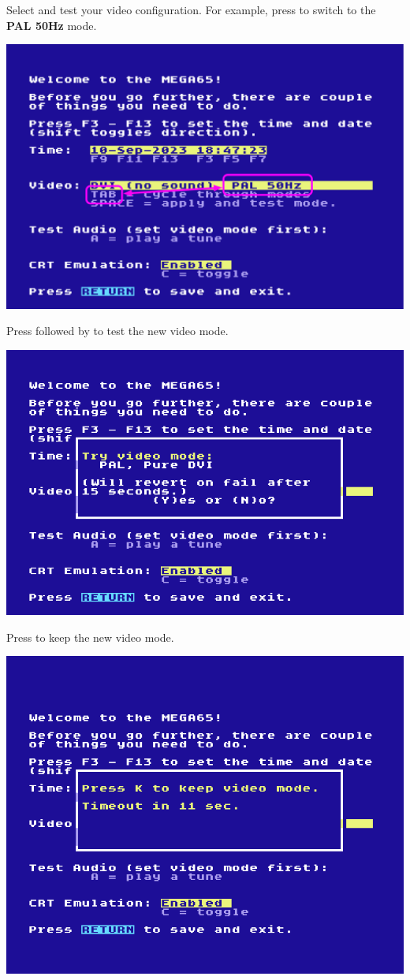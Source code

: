 Select and test your video configuration. For example, press  to switch to the {\bf PAL 50Hz} mode.
\begin{center}
  \includegraphics[width=0.7\linewidth]{images/img011_final_boot_02.png}
\end{center}

Press  followed by  to test the new video mode.

\begin{center}
  \includegraphics[width=0.7\linewidth]{images/img011_final_boot_03.png}
\end{center}

Press  to keep the new video mode.

\begin{center}
  \includegraphics[width=0.7\linewidth]{images/img011_final_boot_04.png}
\end{center}

